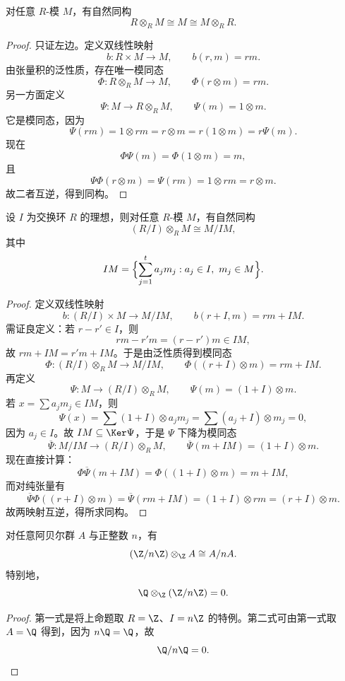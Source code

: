 \begin{proposition}
对任意 $R$-模 $M$，有自然同构
\[
R\otimes_R M\cong M\cong M\otimes_R R.
\]
\end{proposition}

\begin{proof}
只证左边。定义双线性映射
\[
b\colon R\times M\to M,
\qquad b(r,m)=rm.
\]
由张量积的泛性质，存在唯一模同态
\[
\Phi\colon R\otimes_R M\to M,
\qquad \Phi(r\otimes m)=rm.
\]
另一方面定义
\[
\Psi\colon M\to R\otimes_R M,
\qquad \Psi(m)=1\otimes m.
\]
它是模同态，因为
\[
\Psi(rm)=1\otimes rm=r\otimes m=r(1\otimes m)=r\Psi(m).
\]
现在
\[
\Phi\Psi(m)=\Phi(1\otimes m)=m,
\]
且
\[
\Psi\Phi(r\otimes m)=\Psi(rm)=1\otimes rm=r\otimes m.
\]
故二者互逆，得到同构。
\end{proof}

\begin{proposition}
设 $I$ 为交换环 $R$ 的理想，则对任意 $R$-模 $M$，有自然同构
\[
(R/I)\otimes_R M\cong M/IM,
\]
其中
\[
IM=\Bigl\{\sum_{j=1}^t a_jm_j: a_j\in I,\ m_j\in M\Bigr\}.
\]
\end{proposition}

\begin{proof}
定义双线性映射
\[
b\colon (R/I)\times M\to M/IM,
\qquad b(r+I,m)=rm+IM.
\]
需证良定义：若 $r-r'\in I$，则
\[
rm-r'm=(r-r')m\in IM,
\]
故 $rm+IM=r'm+IM$。于是由泛性质得到模同态
\[
\Phi\colon (R/I)\otimes_R M\to M/IM,
\qquad \Phi((r+I)\otimes m)=rm+IM.
\]
再定义
\[
\Psi\colon M\to (R/I)\otimes_R M,
\qquad \Psi(m)=(1+I)\otimes m.
\]
若 $x=\sum a_jm_j\in IM$，则
\[
\Psi(x)=\sum (1+I)\otimes a_jm_j=\sum (a_j+I)\otimes m_j=0,
\]
因为 $a_j\in I$。故 $IM\subseteq \Ker\Psi$，于是 $\Psi$ 下降为模同态
\[
\overline\Psi\colon M/IM\to (R/I)\otimes_R M,
\qquad \overline\Psi(m+IM)=(1+I)\otimes m.
\]
现在直接计算：
\[
\Phi\overline\Psi(m+IM)=\Phi((1+I)\otimes m)=m+IM,
\]
而对纯张量有
\[
\overline\Psi\Phi((r+I)\otimes m)=\overline\Psi(rm+IM)=(1+I)\otimes rm=(r+I)\otimes m.
\]
故两映射互逆，得所求同构。
\end{proof}

\begin{corollary}
对任意阿贝尔群 $A$ 与正整数 $n$，有
\[
(\Z/n\Z)\otimes_\Z A\cong A/nA.
\]
特别地，
\[
\Q\otimes_\Z (\Z/n\Z)=0.
\]
\end{corollary}

\begin{proof}
第一式是将上命题取 $R=\Z$、$I=n\Z$ 的特例。第二式可由第一式取 $A=\Q$ 得到，因为 $n\Q=\Q$，故
\[
\Q/n\Q=0.
\]
\end{proof}

